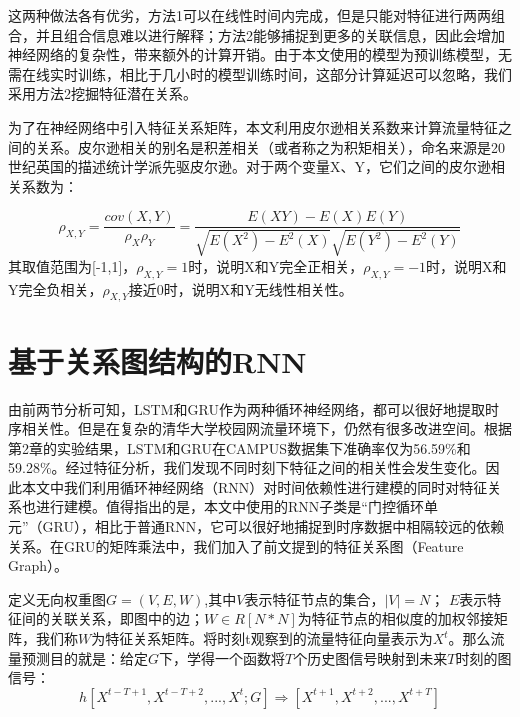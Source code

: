 这两种做法各有优劣，方法1可以在线性时间内完成，但是只能对特征进行两两组合，并且组合信息难以进行解释；方法2能够捕捉到更多的关联信息，因此会增加神经网络的复杂性，带来额外的计算开销。由于本文使用的模型为预训练模型，无需在线实时训练，相比于几小时的模型训练时间，这部分计算延迟可以忽略，我们采用方法2挖掘特征潜在关系。

为了在神经网络中引入特征关系矩阵，本文利用皮尔逊相关系数来计算流量特征之间的关系。皮尔逊相关的别名是积差相关（或者称之为积矩相关），命名来源是20 世纪英国的描述统计学派先驱皮尔逊。对于两个变量X、Y，它们之间的皮尔逊相关系数为：


\begin{equation}
  \rho_{X,Y} = \frac{cov(X,Y)}{\rho_X\rho_Y}=\frac{E(XY)-E(X)E(Y)}{\sqrt{E(X^2)-E^2(X)}\sqrt{E(Y^2)-E^2(Y)}}
\end{equation}
其取值范围为[-1,1]，$\rho_{X,Y}=1$时，说明X和Y完全正相关，$\rho_{X,Y}=-1$时，说明X和Y完全负相关，$\rho_{X,Y}$接近0时，说明X和Y无线性相关性。





\section{基于关系图结构的RNN}
由前两节分析可知，LSTM和GRU作为两种循环神经网络，都可以很好地提取时序相关性。但是在复杂的清华大学校园网流量环境下，仍然有很多改进空间。根据第2章的实验结果，LSTM和GRU在CAMPUS数据集下准确率仅为56.59\%和59.28\%。经过特征分析，我们发现不同时刻下特征之间的相关性会发生变化。因此本文中我们利用循环神经网络（RNN）对时间依赖性进行建模的同时对特征关系也进行建模。值得指出的是，本文中使用的RNN子类是“门控循环单元”（GRU），相比于普通RNN，它可以很好地捕捉到时序数据中相隔较远的依赖关系\cite{li2017diffusion}。在GRU的矩阵乘法中，我们加入了前文提到的特征关系图（Feature Graph）。

定义无向权重图$G=(V,E,W)$,其中$V$表示特征节点的集合，$|V|=N$； $E$表示特征间的关联关系，即图中的边；$W \in R[N*N]$为特征节点的相似度的加权邻接矩阵，我们称$W$为特征关系矩阵。将时刻t观察到的流量特征向量表示为$X^t$。那么流量预测目的就是：给定$G$下，学得一个函数将$T$个历史图信号映射到未来$T$时刻的图信号：
\begin{equation}
    h[X^{t-T+1}, X^{t-T+2},...,X^{t}; G] \Rightarrow [X^{t+1}, X^{t+2}, ..., X^{t+T}]
\end{equation}

